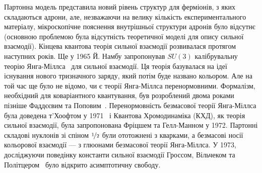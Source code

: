 Партонна модель представила новий рівень структур для ферміонів, з яких складаються адрони, але, незважаючи на велику кількість експериментального матеріалу, мікроскопічне пояснення внутрішньої структури адронів було відсутнє (основною проблемою була відсутність теоретичної моделі для опису сильної взаємодії). Кінцева квантова теорія сильної взаємодії розвивалася протягом наступних років. Ще у 1965 Й. Намбу запропонував $SU\left(3\right)$ калібрувальну теорію Янга-Міллса~\cite{Yang:1954ek} для сильної взаємодії. Ця теорія базувалася на ідеї існування нового тризначного заряду, який потім буде названо кольором. Але на той час ще було не відомо, чи є теорії Янга-Міллса перенормовними. Формалізм, необхідний для коваріантного квантування, був розроблений двома роками пізніше Фаддєєвим та Поповим~\cite{Faddeev:1967fc}. Перенормовність безмасової теорії Янга-Міллса була  доведена т'Хоофтом у 1971~\cite{tHooft:1971fh} і Квантова Хромодинаміка (КХД), як теорія сильної взаємодії, була запропонована Фріцшем та Гелл-Манном у 1972. Партонні складові нуклонів зі спіном $\nicefrac{1}{2}$ були ототожнені з кварками, а безмасові носії кольорової взаємодії --- з глюонами безмасової теорії Янга-Міллса. У 1973, досліджуючи поведінку константи сильної взаємодії Гроссом, Вільчеком та Політцером~\cite{Gross:1973id,Politzer:1973fx} було відкрито асимптотичну свободу.

